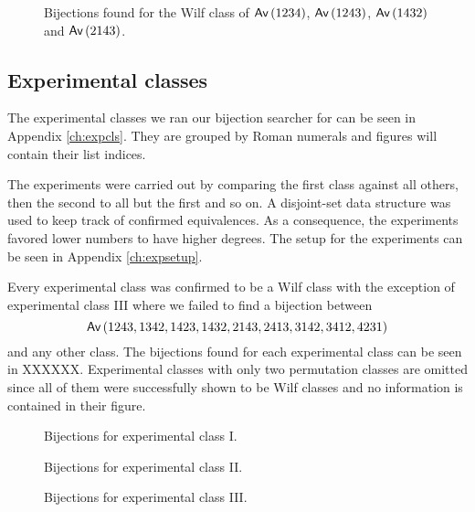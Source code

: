 \begin{figure}[ht!]
    \centering
    
    \caption{Bijections found for the Wilf class of $\textsf{Av}\left(1234\right)$, $\textsf{Av}\left(1243\right)$, $\textsf{Av}\left(1432\right)$ and $\textsf{Av}\left(2143\right)$.}
    \label{fig:1x4bi}
\end{figure}

\subsection{Experimental classes}
The experimental classes we ran our bijection searcher for can be seen in Appendix \ref{ch:expcls}. They are grouped by Roman numerals and figures will contain their list indices.

The experiments were carried out by comparing the first class against all others, then the second to all but the first and so on. A disjoint-set data structure was used to keep track of confirmed equivalences. As a consequence, the experiments favored lower numbers to have higher degrees. The setup for the experiments can be seen in Appendix \ref{ch:expsetup}.

Every experimental class was confirmed to be a Wilf class with the exception of experimental class III where we failed to find a bijection between
\[
    \textsf{Av}\left(1243,1342,1423,1432,2143,2413,3142,3412,4231\right)
\]
and any other class. The bijections found for each experimental class can be seen in XXXXXX. Experimental classes with only two permutation classes are omitted since all of them were successfully shown to be Wilf classes and no information is contained in their figure.


\begin{figure}[ht!]
    \centering
    
    \caption{Bijections for experimental class I.}
    \label{fig:expgrp_I}
\end{figure}


\begin{figure}[ht!]
    \centering
    
    \caption{Bijections for experimental class II.}
    \label{fig:expgrp_II}
\end{figure}


\begin{figure}[ht!]
    \centering
    
    \caption{Bijections for experimental class III.}
    \label{fig:expgrp_III}
\end{figure}


